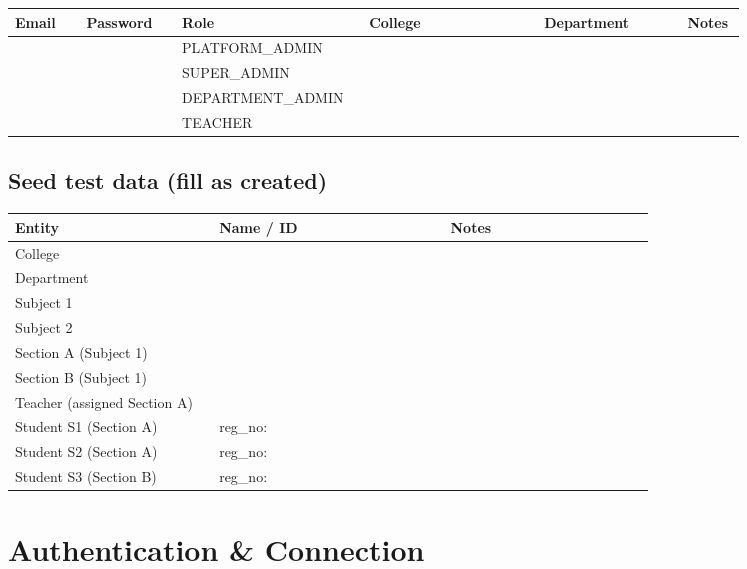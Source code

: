 \documentclass[11pt,a4paper,oneside]{article}
\begin{document}
\small
\begin{tabular}{@{}>{\raggedright\arraybackslash}p{0.09\linewidth} >{\raggedright\arraybackslash}p{0.12\linewidth} >{\raggedright\arraybackslash}p{0.18\linewidth} >{\raggedright\arraybackslash}p{0.22\linewidth} >{\raggedright\arraybackslash}p{0.18\linewidth} >{\centering\arraybackslash}p{0.06\linewidth}@{}}
  \toprule
  \textbf{Email} & \textbf{Password} & \textbf{Role} & \textbf{College} & \textbf{Department} & \textbf{Notes} \\
  \midrule
  & & PLATFORM\_ADMIN     & & & \\
  & & SUPER\_ADMIN        & & & \\
  & & DEPARTMENT\_ADMIN   & & & \\
  & & TEACHER             & & & \\
  \bottomrule
\end{tabular}
\normalsize

\subsection{Seed test data (fill as created)}

\small
\begin{tabular}{@{}>{\raggedright\arraybackslash}p{0.30\linewidth} >{\raggedright\arraybackslash}p{0.34\linewidth} >{\raggedright\arraybackslash}p{0.30\linewidth}@{}}
  \toprule
  \textbf{Entity} & \textbf{Name / ID} & \textbf{Notes} \\
  \midrule
  College                      & & \\
  Department                   & & \\
  Subject 1                    & & \\
  Subject 2                    & & \\
  Section A (Subject 1)        & & \\
  Section B (Subject 1)        & & \\
  Teacher (assigned Section A) & & \\
  Student S1 (Section A)       & reg\_no: & \\
  Student S2 (Section A)       & reg\_no: & \\
  Student S3 (Section B)       & reg\_no: & \\
  \bottomrule
\end{tabular}
\normalsize

\section{Authentication \& Connection}
\end{document}
